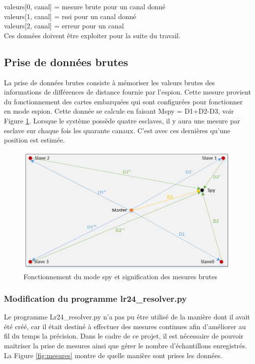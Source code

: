 valeurs[0, canal] = mesure brute pour un canal donné\.\\
valeurs[1, canal] = rssi pour un canal donné\.\\
valeurs[2, canal] = erreur pour un canal\.\\

Ces données doivent être exploiter pour la suite du travail. 

\subsection{Prise de données brutes}
La prise de données brutes consiste à mémoriser les valeurs brutes des informations de différences de distance fournie par l'espion. Cette mesure provient du fonctionnement des cartes embarquées qui sont configurées pour fonctionner en mode espion. Cette donnée se calcule en faisant Mspy = D1+D2-D3, voir Figure \ref{fig:mesures3}. Lorsque le système possède quatre esclaves, il y aura une mesure par esclave sur chaque fois les quarante canaux. C'est avec ces dernières qu'une position est estimée. 

\begin{figure}[htp]
 \begin{center}
  \includegraphics[scale=0.6]{figures/mesures3.png}
  \caption{Fonctionnement du mode spy et signification des mesures brutes}
  \label{fig:mesures3} %
 \end{center}
\end{figure}
 
\subsubsection{Modification du programme lr24\_resolver.py}
Le programme Lr24\_resolver.py n'a pas pu être utilisé de la manière dont il avait été créé, car il était destiné à effectuer des mesures continues afin d'améliorer au fil du temps la précision. Dans le cadre de ce projet, il est nécessaire de pouvoir maitriser la prise de mesures ainsi que gérer le nombre d'échantillons enregistrés. La Figure \ref{fig:mesures} montre de quelle manière sont prises les données.

